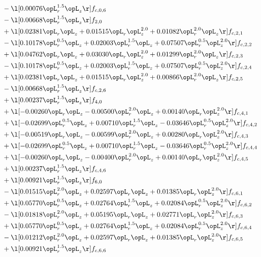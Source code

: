 \begin{alignat}{2}
& - \l[  0.00076 \opL_r^{1.5} \opL_z  \r] f_{c,0,6} \nonumber \\ 
& - \l[  0.00668 \opL_r^{1.5} \opL_z  \r] f_{2,0} \nonumber \\ 
& + \l[  0.02381 \opL_r \opL_z +  0.01515 \opL_r \opL_z^{2.0} +  0.01082 \opL_r^{2.0} \opL_z  \r] f_{c,2,1} \nonumber \\ 
& - \l[  0.10178 \opL_r^{0.5} \opL_z +  0.02003 \opL_r^{1.5} \opL_z +  0.07507 \opL_r^{0.5} \opL_z^{2.0}  \r] f_{c,2,2} \nonumber \\ 
& + \l[  0.04762 \opL_r \opL_z +  0.03030 \opL_r \opL_z^{2.0} +  0.01299 \opL_r^{2.0} \opL_z  \r] f_{c,2,3} \nonumber \\ 
& - \l[  0.10178 \opL_r^{0.5} \opL_z +  0.02003 \opL_r^{1.5} \opL_z +  0.07507 \opL_r^{0.5} \opL_z^{2.0}  \r] f_{c,2,4} \nonumber \\ 
& + \l[  0.02381 \opL_r \opL_z +  0.01515 \opL_r \opL_z^{2.0} +  0.00866 \opL_r^{2.0} \opL_z  \r] f_{c,2,5} \nonumber \\ 
& - \l[  0.00668 \opL_r^{1.5} \opL_z  \r] f_{c,2,6} \nonumber \\ 
& + \l[  0.00237 \opL_r^{1.5} \opL_z  \r] f_{4,0} \nonumber \\ 
& + \l[  -0.00260 \opL_r \opL_z   -0.00500 \opL_r^{2.0} \opL_z +  0.00140 \opL_r \opL_z^{2.0}  \r] f_{c,4,1} \nonumber \\ 
& + \l[  -0.02699 \opL_r^{0.5} \opL_z +  0.00710 \opL_r^{1.5} \opL_z   -0.03646 \opL_r^{0.5} \opL_z^{2.0}  \r] f_{c,4,2} \nonumber \\ 
& + \l[  -0.00519 \opL_r \opL_z   -0.00599 \opL_r^{2.0} \opL_z +  0.00280 \opL_r \opL_z^{2.0}  \r] f_{c,4,3} \nonumber \\ 
& + \l[  -0.02699 \opL_r^{0.5} \opL_z +  0.00710 \opL_r^{1.5} \opL_z   -0.03646 \opL_r^{0.5} \opL_z^{2.0}  \r] f_{c,4,4} \nonumber \\ 
& + \l[  -0.00260 \opL_r \opL_z   -0.00400 \opL_r^{2.0} \opL_z +  0.00140 \opL_r \opL_z^{2.0}  \r] f_{c,4,5} \nonumber \\ 
& + \l[  0.00237 \opL_r^{1.5} \opL_z  \r] f_{c,4,6} \nonumber \\ 
& + \l[  0.00921 \opL_r^{1.5} \opL_z  \r] f_{6,0} \nonumber \\ 
& - \l[  0.01515 \opL_r^{2.0} \opL_z +  0.02597 \opL_r \opL_z +  0.01385 \opL_r \opL_z^{2.0}  \r] f_{c,6,1} \nonumber \\ 
& + \l[  0.05770 \opL_r^{0.5} \opL_z +  0.02764 \opL_r^{1.5} \opL_z +  0.02084 \opL_r^{0.5} \opL_z^{2.0}  \r] f_{c,6,2} \nonumber \\ 
& - \l[  0.01818 \opL_r^{2.0} \opL_z +  0.05195 \opL_r \opL_z +  0.02771 \opL_r \opL_z^{2.0}  \r] f_{c,6,3} \nonumber \\ 
& + \l[  0.05770 \opL_r^{0.5} \opL_z +  0.02764 \opL_r^{1.5} \opL_z +  0.02084 \opL_r^{0.5} \opL_z^{2.0}  \r] f_{c,6,4} \nonumber \\ 
& - \l[  0.01212 \opL_r^{2.0} \opL_z +  0.02597 \opL_r \opL_z +  0.01385 \opL_r \opL_z^{2.0}  \r] f_{c,6,5} \nonumber \\ 
& + \l[  0.00921 \opL_r^{1.5} \opL_z  \r] f_{c,6,6} \nonumber \\ 
\end{alignat} 


